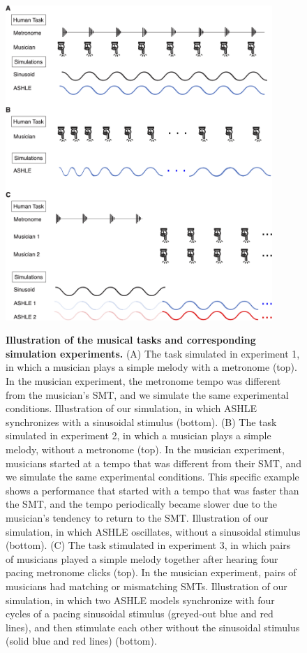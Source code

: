 \documentclass{report}
\begin{document}
\begin{figure}
    \centering
    \includegraphics[width=0.9\textwidth]{figures/fig3_1.png}
    \label{f3_1}
\end{figure}
\begin{figure}[t]
    \caption[Illustration of the musical tasks and corresponding simulation experiments]{\textbf{Illustration of the musical tasks and corresponding simulation experiments.} (A) The task simulated in experiment 1, in which a musician plays a simple melody with a metronome (top). In the musician experiment, the metronome tempo was different from the musician's SMT, and we simulate the same experimental conditions. Illustration of our simulation, in which ASHLE synchronizes with a sinusoidal stimulus (bottom). (B) The task simulated in experiment 2, in which a musician plays a simple melody, without a metronome (top). In the musician experiment, musicians started at a tempo that was different from their SMT, and we simulate the same experimental conditions. This specific example shows a performance that started with a tempo that was faster than the SMT, and the tempo periodically became slower due to the musician's tendency to return to the SMT. Illustration of our simulation, in which ASHLE oscillates, without a sinusoidal stimulus (bottom). (C) The task stimulated in experiment 3, in which pairs of musicians played a simple melody together after hearing four pacing metronome clicks (top). In the musician experiment, pairs of musicians had matching or mismatching SMTs. Illustration of our simulation, in which two ASHLE models synchronize with four cycles of a pacing sinusoidal stimulus (greyed-out blue and red lines), and then stimulate each other without the sinusoidal stimulus (solid blue and red lines) (bottom).} 
\end{figure}
\end{document}
